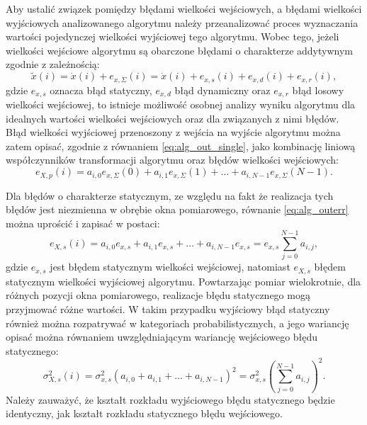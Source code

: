Aby ustalić związek pomiędzy błędami wielkości wejściowych, a błędami wielkości wyjściowych analizowanego algorytmu należy przeanalizować proces wyznaczania wartości pojedynczej wielkości wyjściowej tego algorytmu. Wobec tego, jeżeli wielkości wejściowe algorytmu są obarczone błędami o charakterze addytywnym zgodnie z zależnością:
\begin{equation}
\tilde{x} \left( i \right) = \dot{x} \left( i \right) + e_{x,\Sigma} \left( i \right) = \dot{x} \left( i \right) + e_{x,s} \left( i \right) + e_{x,d} \left( i \right) + e_{x,r} \left( i \right) \label{eq:alg_inputval},
\end{equation}
gdzie $e_{x,s}$ oznacza błąd statyczny, $e_{x,d}$ błąd dynamiczny oraz $e_{x,r}$ błąd losowy wielkości wejściowej, to istnieje możliwość osobnej analizy wyniku algorytmu dla idealnych wartości wielkości wejściowych oraz dla związanych z nimi błędów. Błąd wielkości wyjściowej przenoszony z wejścia na wyjście algorytmu można zatem opisać, zgodnie z równaniem \eqref{eq:alg_out_single}, jako kombinację liniową współczynników transformacji algorytmu oraz błędów wielkości wejściowych:
\begin{equation}
e_{X,p} \left( i \right) = a_{i, 0} e_{x,\Sigma} \left( 0 \right) + a_{i, 1} e_{x,\Sigma} \left( 1 \right) + \hdots + a_{i, N-1} e_{x,\Sigma} \left( N-1 \right) \label{eq:alg_outerr}.
\end{equation}

Dla błędów o charakterze statycznym, ze względu na fakt że realizacja tych błędów jest niezmienna w obrębie okna pomiarowego, równanie \eqref{eq:alg_outerr} można uprościć i zapisać w postaci:
\begin{equation}
e_{X,s} \left( i \right) = a_{i, 0} e_{x,s} + a_{i, 1} e_{x,s} + \hdots + a_{i, N-1} e_{x,s} = e_{x,s} \sum _{j = 0} ^{N-1} a_{i, j} \label{eq:alg_outerr_stat},
\end{equation}
gdzie $e_{x,s}$ jest błędem statycznym wielkości wejściowej, natomiast $e_{X,s}$ błędem statycznym wielkości wyjściowej algorytmu. Powtarzając pomiar wielokrotnie, dla różnych pozycji okna pomiarowego, realizacje błędu statycznego mogą przyjmować różne wartości. W takim przypadku wyjściowy błąd statyczny również można rozpatrywać w kategoriach probabilistycznych, a jego wariancję opisać można równaniem uwzględniającym wariancję wejściowego błędu statycznego:
\begin{equation}
\sigma_{X,s}^{2} \left( i \right) = \sigma_{x,s}^{2} \left( a_{i, 0} + a_{i, 1} + \hdots + a_{i, N-1} \right)^{2} = \sigma_{x,s}^{2} \left( \sum _{j = 0} ^{N-1} a_{i, j} \right)^{2} \label{eq:alg_outvar_stat}.
\end{equation}
Należy zauważyć, że kształt rozkładu wyjściowego błędu statycznego będzie identyczny, jak kształt rozkładu statycznego błędu wejściowego.

